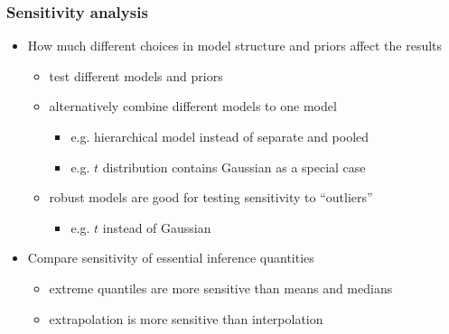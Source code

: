 \documentclass[10pt]{beamer}
\begin{document}
\begin{frame}

\frametitle{Sensitivity analysis}

  \begin{itemize}
  \item How much different choices in model structure and priors affect the results
    \begin{itemize}
      \item<2-> test different models and priors
      \item<3-> alternatively combine different models to one model
        \begin{itemize}
        \item e.g. hierarchical model instead of separate and pooled
        \item e.g. $t$ distribution contains Gaussian as a special case
      \end{itemize}
      \item<3-> robust models are good for testing sensitivity to ``outliers''
        \begin{itemize}
        \item e.g. $t$ instead of Gaussian
        \end{itemize}
    \end{itemize}
    \item<4-> Compare sensitivity of essential inference quantities
      \begin{itemize}
      \item extreme quantiles are more sensitive than means and medians
      \item extrapolation is more sensitive than interpolation
      \end{itemize}
    \end{itemize}

\end{frame}
\end{document}
